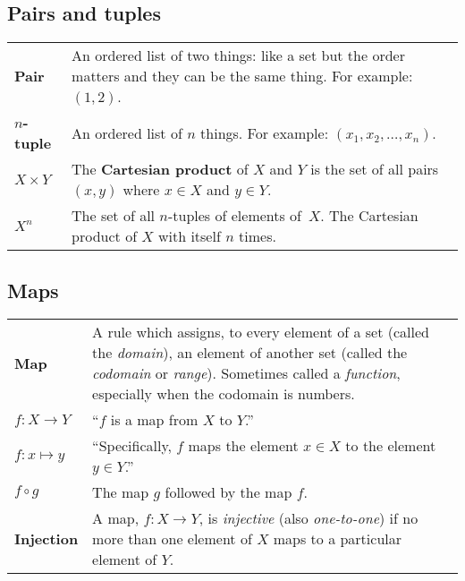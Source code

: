 \documentclass[10pt, a4paper, landscape]{article}
\newcommand{\defn}[1]{\textbf{#1}}
\begin{document}
\begin{multicols*}{3}
\subsection*{Pairs and tuples}
\begin{tabularx}{\columnwidth}{@{}l>{\raggedright\arraybackslash}X@{}}
  \toprule
  \defn{Pair} & An ordered list of two things: like a set but the order matters and they can be the same thing. For example: $(1, 2)$. \\
  
  \defn{$n$-tuple} & An ordered list of $n$ things. For example: $(x_1, x_2,\dotsc, x_n)$. \\

  $X\times Y$      & The \defn{Cartesian product} of $X$ and $Y$ is the set
  of all pairs $(x,y)$ where $x \in X$ and $y \in Y$. \\

  $X^n$ & The set of all $n$-tuples of elements of~$X$. The Cartesian product of $X$ with itself $n$ times. \\

\end{tabularx}


\subsection*{Maps}
\begin{tabularx}{\columnwidth}{@{}l>{\raggedright\arraybackslash}X@{}}
  \toprule
  \defn{Map} & A rule which assigns, to every element of a set (called the \emph{domain}), an element of another set (called the \emph{codomain} or \emph{range}). Sometimes called a \emph{function}, especially when the codomain is numbers. \\

  $f\colon X\to Y$   & ``$f$ is a map from $X$ to $Y$.'' \\

  $f\colon x \mapsto y$  & ``Specifically, $f$ maps the element $x \in X$ to the
  element $y \in Y$.'' \\
  $f \circ g$    & The map $g$ followed by the map $f$. \\

  \defn{Injection} & A map, $f\colon X \to Y$, is \emph{injective} (also
  \emph{one-to-one}) if no more than one element of $X$ maps to a
  particular element of $Y$. \\


\end{tabularx}
\end{multicols*}
\end{document}
